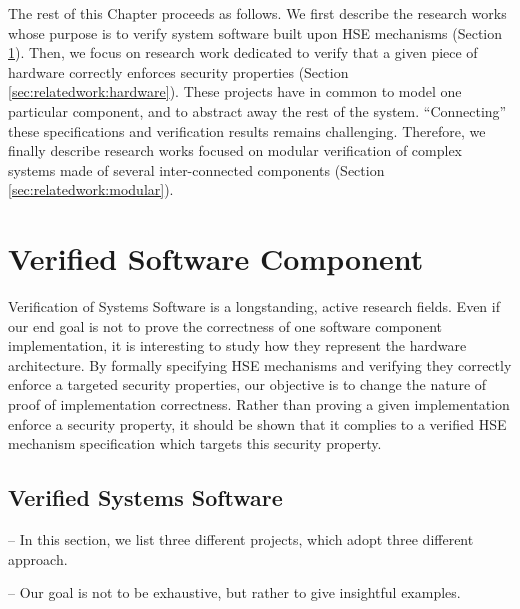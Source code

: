 The rest of this Chapter proceeds as follows.
%
We first describe the research works whose purpose is to verify system software
built upon HSE mechanisms (Section\,\ref{sec:relatedwork:software}).
%
Then, we focus on research work dedicated to verify that a given piece of
hardware correctly enforces security properties
(Section\,\ref{sec:relatedwork:hardware}).
%
These projects have in common to model one particular component, and to abstract
away the rest of the system.
%
``Connecting'' these specifications and verification results remains
challenging.
%
Therefore, we finally describe research works focused on modular verification of
complex systems made of several inter-connected components
(Section\,\ref{sec:relatedwork:modular}).

\section{Verified Software Component} %
\label{sec:relatedwork:software}

Verification of Systems Software is a longstanding, active research fields.
%
Even if our end goal is not to prove the correctness of one software component
implementation, it is interesting to study how they represent the hardware
architecture.
%
By formally specifying HSE mechanisms and verifying they correctly enforce a
targeted security properties, our objective is to change the nature of proof of
implementation correctness.
%
Rather than proving a given implementation enforce a security property, it
should be shown that it complies to a verified HSE mechanism specification which
targets this security property.

\subsection{Verified Systems Software} %

\begin{compactitem}
\item[--] In this section, we list three different projects, which adopt three
  different approach.
\item[--] Our goal is not to be exhaustive, but rather to give insightful
  examples.
\end{compactitem}

